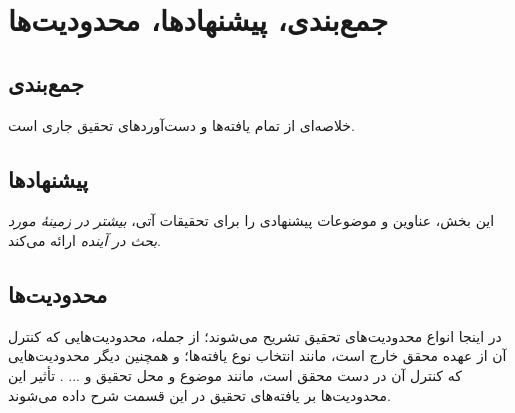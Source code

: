 \chapter{جمع‌بندی، پیشنهاد‌ها، محدودیت‌ها}

\section{جمع‌بندی}
خلاصه‌ای از تمام یافته‌ها و دست‌آوردهای تحقیق جاری است.

\section{پیشنهادها}
این بخش، عناوین و موضوعات پیشنهادی را برای تحقیقات آتی،
\emph{بیشتر در زمینهٔ مورد بحث در آینده}
ارائه می‌کند.

\section{محدودیت‌ها}
در اینجا انواع محدودیت‌های تحقیق تشریح می‌شوند؛ از جمله، محدودیت‌هایی که کنترل آن از عهده محقق خارج است، مانند انتخاب نوع یافته‌ها؛ و همچنین دیگر محدودیت‌هایی که کنترل آن در دست محقق است، مانند موضوع و محل تحقیق و ... . تأثیر این محدودیت‌ها بر یافته‌های تحقیق در این قسمت شرح داده می‌شوند.